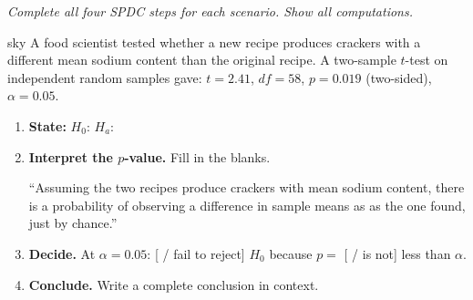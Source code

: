 \documentclass[10pt]{article}
\begin{document}
\namepartnerperiod

\vspace{0.1in}

\textit{Complete all four SPDC steps for each scenario. Show all computations.}

\begin{scenariobox}{sky}
A food scientist tested whether a new recipe produces crackers with a different mean
sodium content than the original recipe. A two-sample $t$-test on independent random
samples gave: $t = 2.41$, $df = 58$, $p = 0.019$ (two-sided), $\alpha = 0.05$.

\begin{enumerate}[label=\alph*.]
  \item \textbf{State:} $H_0$:  \quad
        $H_a$: 

  \item \textbf{Interpret the $p$-value.} Fill in the blanks.

        ``Assuming the two recipes produce crackers with  mean sodium content,
        there is a  probability of observing a difference in sample means
        as  as the one found, just by chance.''

  \item \textbf{Decide.} At $\alpha = 0.05$: [ / fail to reject] $H_0$
        because $p = $  [ / is not] less than $\alpha$.

  \item \textbf{Conclude.} Write a complete conclusion in context.
        \ansline{}
\end{enumerate}
\end{scenariobox}
\end{document}
